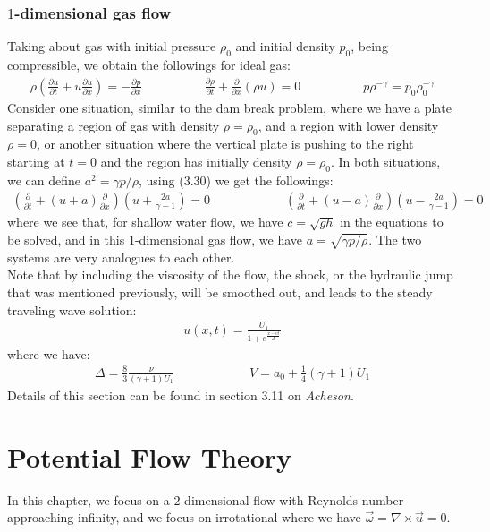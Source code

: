 \documentclass[11pt]{book}
\theoremstyle{break}
\theoremstyle{break}
\newcommand{\pd}{\partial}
\begin{document}
\subsection{$1$-dimensional gas flow}
Taking about gas with initial pressure $\rho_0$ and initial density $p_0$, being compressible, we obtain the followings for ideal gas:
\begin{align}
\rho\left( \frac{\partial u}{\partial t} + u \frac{\partial u}{\partial x}\right) = -\frac{\partial p}{\partial x} \qquad\qquad\quad \frac{\pd \rho}{\pd t} + \frac{\pd }{\pd x}(\rho u) = 0 \qquad\qquad\quad p\rho^{-\gamma} = p_0 \rho_0^{-\gamma}
\end{align}
Consider one situation, similar to the dam break problem, where we have a plate separating a region of gas with density $\rho = \rho_0$, and a region with lower density $\rho = 0$, or another situation where the vertical plate is pushing to the right starting at $t=0$ and the region has initially density $\rho = \rho_0$. In both situations, we can define $a^2 = \gamma p / \rho$, using (3.30) we get the followings:
\begin{align*}
\left( \frac{\pd}{\pd t}+ (u+a) \frac{\pd}{\pd x}\right) \left(u+ \frac{2a}{\gamma - 1}\right) = 0 \qquad\qquad\qquad \left( \frac{\pd}{\pd t}+ (u-a) \frac{\pd}{\pd x}\right)\left( u - \frac{2a}{\gamma-1}\right) = 0
\end{align*}
where we see that, for shallow water flow, we have $c = \sqrt{gh}$ in the equations to be solved, and in this $1$-dimensional gas flow, we have $a = \sqrt{\gamma p/\rho}$. The two systems are very analogues to each other.\\

Note that by including the viscosity of the flow, the shock, or the hydraulic jump that was mentioned previously, will be smoothed out, and leads to the steady traveling wave solution:
\begin{align*}
u(x,t) = \frac{U_1}{1+e^{\frac{x-vt}{\Delta}}}
\end{align*}  
where we have:
\begin{align*}
\Delta = \frac{8}{3}\frac{\nu}{(\gamma+1)U_1} \qquad\qquad\qquad V = a_0 + \frac{1}{4}(\gamma+1) U_1
\end{align*}
Details of this section can be found in section 3.11 on \textit{Acheson}. 

\newpage
\chapter{Potential Flow Theory}
\setcounter{section}{8}
In this chapter, we focus on a $2$-dimensional flow with Reynolds number approaching infinity, and we focus on irrotational where we have $\vec{\omega} = \nabla \times \vec{u} = 0$. \\
\end{document}
